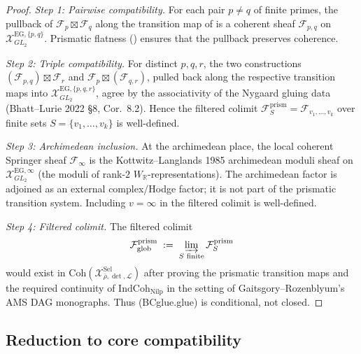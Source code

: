 \begin{proof}
\emph{Step 1: Pairwise compatibility.} For each pair \(p\neq q\) of
finite primes, the pullback of
\(\mathcal{F}_{p}\boxtimes\mathcal{F}_{q}\) along the transition map
of  is a coherent
sheaf \(\mathcal{F}_{p,q}\) on \(\mathcal{X}^{\mathrm{EG},\{p,q\}}_{GL_{2}}\).
Prismatic flatness ()
ensures that the pullback preserves coherence.

\emph{Step 2: Triple compatibility.} For distinct \(p,q,r\), the two
constructions
\((\mathcal{F}_{p,q})\boxtimes\mathcal{F}_{r}\) and
\(\mathcal{F}_{p}\boxtimes(\mathcal{F}_{q,r})\), pulled back along
the respective transition maps into
\(\mathcal{X}^{\mathrm{EG},\{p,q,r\}}_{GL_{2}}\), agree by the
associativity of the Nygaard gluing data (Bhatt--Lurie 2022 \S8,
Cor.~8.2). Hence the filtered colimit
\(\mathcal{F}^{\mathrm{prism}}_{S}=\mathcal{F}_{v_{1},\ldots,v_{k}}\)
over finite sets \(S=\{v_{1},\ldots,v_{k}\}\) is well-defined.

\emph{Step 3: Archimedean inclusion.} At the archimedean place, the
local coherent Springer sheaf \(\mathcal{F}_{\infty}\) is the
Kottwitz--Langlands 1985 archimedean moduli sheaf on
\(\mathcal{X}^{\mathrm{EG},\infty}_{GL_{2}}\) (the moduli of rank-\(2\)
\(W_{\mathbb{R}}\)-representations). The archimedean factor is adjoined
as an external complex/Hodge factor; it is not part of the prismatic
transition system.
Including \(v=\infty\) in the filtered colimit is well-defined.

\emph{Step 4: Filtered colimit.} The filtered colimit
\[
\mathcal{F}_{\mathrm{glob}}^{\mathrm{prism}}\;:=\;\varinjlim_{S\text{ finite}}\mathcal{F}^{\mathrm{prism}}_{S}
\]
would exist in \(\mathrm{Coh}(\mathcal{X}^{\mathrm{Sel}}_{\bar\rho,\det,\mathcal{L}})\)
after proving the prismatic transition maps and the required
continuity of \(\mathrm{IndCoh}_{\mathrm{Nilp}}\) in the setting of
Gaitsgory--Rozenblyum's AMS DAG monographs. Thus (BCglue.glue) is
conditional, not closed.
\end{proof}

\subsection{Reduction to core compatibility}

